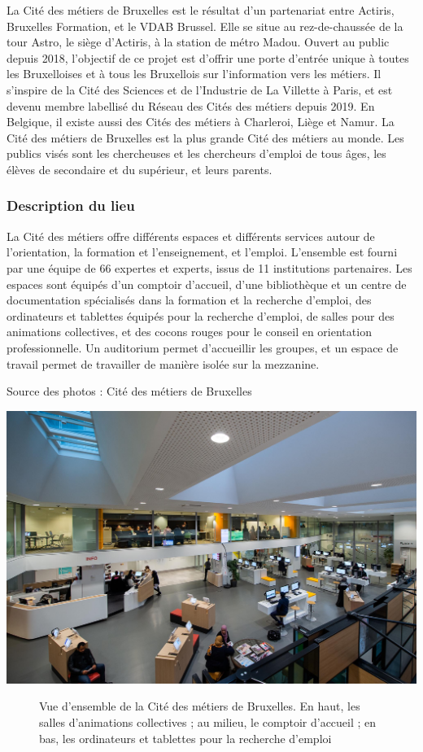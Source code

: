 \documentclass[french,a4paper,12pt]{article}
\begin{document}
{\quad La Cité des métiers de Bruxelles est le résultat d’un partenariat entre Actiris, Bruxelles Formation, et le VDAB Brussel. Elle se situe au rez-de-chaussée de la tour Astro, le siège d’Actiris, à la station de métro Madou.
Ouvert au public depuis 2018, l’objectif de ce projet est d’offrir une porte d’entrée unique à toutes les Bruxelloises et à tous les Bruxellois sur l’information vers les métiers. Il s’inspire de la Cité des Sciences et de l’Industrie de La Villette à Paris, et est devenu membre labellisé du Réseau des Cités des métiers depuis 2019. En Belgique, il existe aussi des Cités des métiers à Charleroi, Liège et Namur. La Cité des métiers de Bruxelles est la plus grande Cité des métiers au monde.
Les publics visés sont les chercheuses et les chercheurs d’emploi de tous âges, les élèves de secondaire et du supérieur, et leurs parents.

\subsubsection{Description du lieu}

\quad La Cité des métiers offre différents espaces et différents services autour de l’orientation, la formation et l’enseignement, et l’emploi. L’ensemble est fourni par une équipe de 66 expertes et experts, issus de 11 institutions partenaires. 
Les espaces sont équipés d’un comptoir d’accueil, d’une bibliothèque et un centre de documentation spécialisés dans la formation et la recherche d’emploi, des ordinateurs et tablettes équipés pour la recherche d’emploi, de salles pour des animations collectives, et des cocons rouges pour le conseil en orientation professionnelle. Un auditorium permet d’accueillir les groupes, et un espace de travail permet de travailler de manière isolée sur la mezzanine.

Source des photos : Cité des métiers de Bruxelles

\begin{center}
\includegraphics[scale=1]{1-cdm-vue_generale.JPG}
\begin{figure}[h]
\caption{Vue d'ensemble de la Cité des métiers de Bruxelles. En haut, les salles d'animations collectives ; au milieu, le comptoir d’accueil ; en bas, les ordinateurs et tablettes pour la recherche d'emploi}
\end{figure}
\end{center}

}
\end{document}
